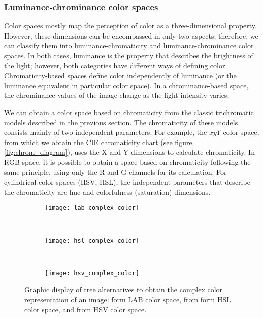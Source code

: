 \subsubsection{Luminance-chrominance color spaces}%

Color spaces mostly map the perception of color as a three-dimensional property. However, these dimensions can be encompassed in only two aspects; therefore, we can classify them into luminance-chromaticity and luminance-chrominance color spaces. In both cases, luminance is the property that describes the brightness of the light; however, both categories have different ways of defining color. Chromaticity-based spaces define color independently of luminance (or the luminance equivalent in particular color space). In a chrominance-based space, the chrominance values of the image change as the light intensity varies.
  
We can obtain a color space based on chromaticity from the classic trichromatic models described in the previous section. The chromaticity of these models consists mainly of two independent parameters. For example, the $xyY$ color space, from which we obtain the CIE chromaticity chart (see figure \ref{fig:chrom_diagram}), uses the X and Y dimensions to calculate chromaticity. In RGB space, it is possible to obtain a space based on chromaticity following the same principle, using only the R and G channels for its calculation. For cylindrical color spaces (HSV, HSL), the independent parameters that describe the chromaticity are hue and colorfulness (saturation) dimensions.

\begin{figure}[!ht] 
	\centering
	\begin{subfigure}[b]{0.48\textwidth}
		\centering
		\texttt{[image: lab\_complex\_color]}
		\caption{}	
		\label{fig:lab_complex_color}
	\end{subfigure}
	~%
	\begin{subfigure}[b]{0.48\textwidth}
		\centering
		\texttt{[image: hsl\_complex\_color]}
		\caption{}	
		\label{fig:hsl_complex_color}
	\end{subfigure}
	~%
	\begin{subfigure}[b]{0.48\textwidth}
		\centering
		\texttt{[image: hsv\_complex\_color]}
		\caption{ }	
		\label{fig:hsv_complex_color}
	\end{subfigure}
	
	\caption{Graphic display of tree alternatives to obtain the complex color representation of an image:  form LAB color space,  from form HSL color space, and  from HSV color space.}
	\label{fig:complex_color_spaces}
\end{figure}

